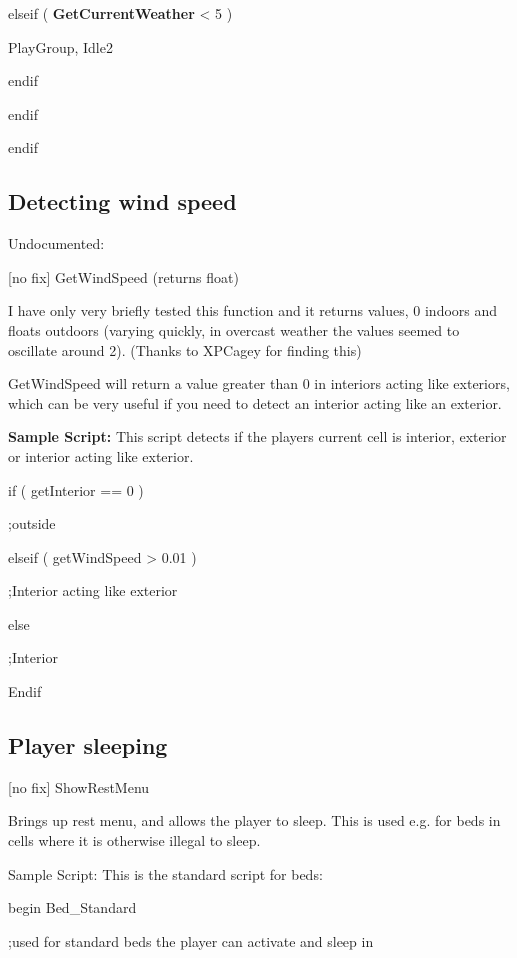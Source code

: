 \documentclass[
]{article}
\begin{document}
elseif ( \textbf{GetCurrentWeather} \textless{} 5 )

PlayGroup, Idle2

endif

endif

endif

\hypertarget{detecting-wind-speed}{%
\subsection{Detecting wind speed}\label{detecting-wind-speed}}

Undocumented:

{[}no fix{]} GetWindSpeed (returns float)

I have only very briefly tested this function and it returns values, 0
indoors and floats outdoors (varying quickly, in overcast weather the
values seemed to oscillate around 2). (Thanks to XPCagey for finding
this)

GetWindSpeed will return a value greater than 0 in interiors acting like
exteriors, which can be very useful if you need to detect an interior
acting like an exterior.

\textbf{Sample Script:} This script detects if the players current cell
is interior, exterior or interior acting like exterior.

if ( getInterior == 0 )

;outside

elseif ( getWindSpeed \textgreater{} 0.01 )

;Interior acting like exterior

else

;Interior

Endif

\hypertarget{player-sleeping}{%
\subsection{\texorpdfstring{\hfill\break
Player sleeping}{ Player sleeping}}\label{player-sleeping}}

{[}no fix{]} ShowRestMenu

Brings up rest menu, and allows the player to sleep. This is used e.g.
for beds in cells where it is otherwise illegal to sleep.

Sample Script: This is the standard script for beds:

begin Bed\_Standard

;used for standard beds the player can activate and sleep in
\end{document}
